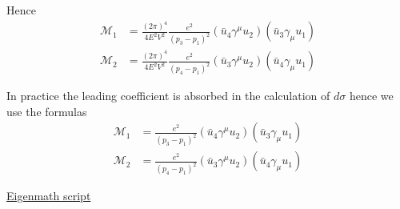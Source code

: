 Hence
\begin{align*}
\mathcal M_1&=\frac{(2\pi)^4}{4E^2V^2}
\frac{e^2}{(p_3-p_1)^2}
(\bar u_4\gamma^\mu u_2)(\bar u_3\gamma_\mu u_1)
\\[1ex]
\mathcal M_2&=\frac{(2\pi)^4}{4E^2V^2}
\frac{e^2}{(p_4-p_1)^2}
(\bar u_3\gamma^\mu u_2)(\bar u_4\gamma_\mu u_1)
\end{align*}

In practice the leading coefficient is absorbed in the calculation of $d\sigma$
hence we use the formulas
\begin{align*}
\mathcal M_1&=
\frac{e^2}{(p_3-p_1)^2}
(\bar u_4\gamma^\mu u_2)(\bar u_3\gamma_\mu u_1)
\\[1ex]
\mathcal M_2&=
\frac{e^2}{(p_4-p_1)^2}
(\bar u_3\gamma^\mu u_2)(\bar u_4\gamma_\mu u_1)
\end{align*}

\href{https://georgeweigt.github.io/examples/moller-scattering-2-demo.html}{Eigenmath script}


